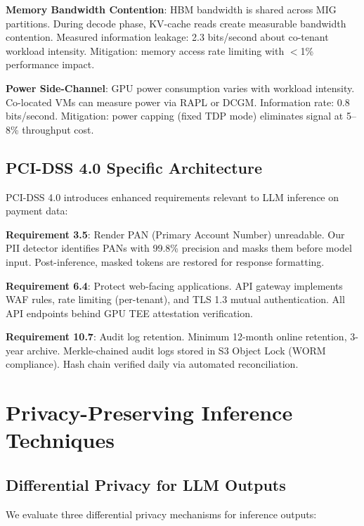 \documentclass[conference,10pt]{IEEEtran}
\begin{document}
\textbf{Memory Bandwidth Contention}: HBM bandwidth is shared across MIG partitions. During decode phase, KV-cache reads create measurable bandwidth contention. Measured information leakage: 2.3 bits/second about co-tenant workload intensity. Mitigation: memory access rate limiting with $<$1\% performance impact.

\textbf{Power Side-Channel}: GPU power consumption varies with workload intensity. Co-located VMs can measure power via RAPL or DCGM. Information rate: 0.8 bits/second. Mitigation: power capping (fixed TDP mode) eliminates signal at 5--8\% throughput cost.

\subsection{PCI-DSS 4.0 Specific Architecture}

PCI-DSS 4.0 introduces enhanced requirements relevant to LLM inference on payment data:

\textbf{Requirement 3.5}: Render PAN (Primary Account Number) unreadable. Our PII detector identifies PANs with 99.8\% precision and masks them before model input. Post-inference, masked tokens are restored for response formatting.

\textbf{Requirement 6.4}: Protect web-facing applications. API gateway implements WAF rules, rate limiting (per-tenant), and TLS 1.3 mutual authentication. All API endpoints behind GPU TEE attestation verification.

\textbf{Requirement 10.7}: Audit log retention. Minimum 12-month online retention, 3-year archive. Merkle-chained audit logs stored in S3 Object Lock (WORM compliance). Hash chain verified daily via automated reconciliation.


\section{Privacy-Preserving Inference Techniques}
\label{sec:privacy}

\subsection{Differential Privacy for LLM Outputs}

We evaluate three differential privacy mechanisms for inference outputs:
\end{document}
